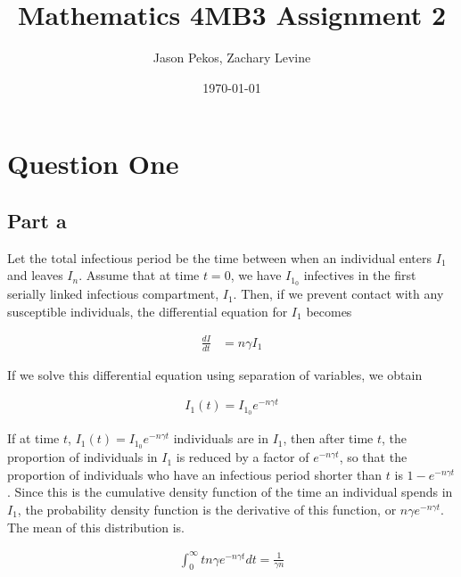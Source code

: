 \documentclass[12pt]{article}
\begin{document}
\linenumbers

\title{Mathematics 4MB3 Assignment 2}
\author{Jason Pekos, Zachary Levine}
\date{\today}
\maketitle

\section*{Question One}

\subsection*{Part a}
Let the total infectious period be the time between when an individual enters $I_1$ and leaves $I_n$. Assume that at time $t = 0$, we have $I_{1_0}$ infectives in the first serially linked infectious compartment, $I_1$. Then, if we prevent contact with any susceptible individuals, the differential equation for $I_1$ becomes
\begin{linenomath}
\begin{align*}
\frac{dI}{dt} &= n \gamma I_1
\end{align*}
\end{linenomath}

If we solve this differential equation using separation of variables, we obtain
\begin{linenomath}
\begin{align*}
I_1(t) = I_{1_0} e ^{-n\gamma t}
\end{align*}
\end{linenomath}

If at time $t$, $I_1(t) = I_{1_0} e^{-n\gamma t}$ individuals are in $I_1$, then after time $t$, the proportion of individuals in $I_1$ is reduced by a factor of $e^{-n\gamma t}$, so that the proportion of individuals who have an infectious period shorter than $t$ is $1-e^{-n\gamma t}$. Since this is the cumulative density function of the time an individual spends in $I_1$, the probability density function is the derivative of this function, or $n\gamma e^{-n\gamma t}$. The mean of this distribution is.

\begin{linenomath}
\begin{align*}
\int_{0}^{\infty} t n\gamma e^{-n\gamma t} dt = \frac{1}{\gamma n}
 \end{align*}
\end{linenomath}
\end{document}
